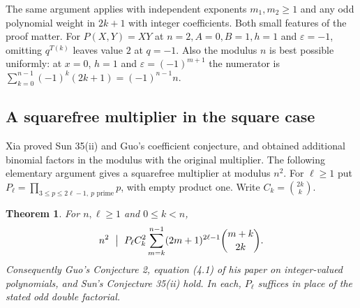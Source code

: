 \documentclass[11pt,a4paper]{article}
\newtheorem{theorem}{Theorem}[section]\newtheorem{lemma}[theorem]{Lemma}
\theoremstyle{definition}\newtheorem{problem}[theorem]{Auxiliary problem}
\theoremstyle{remark}\newtheorem*{remark}{Remark}
\begin{document}
The same argument applies with independent exponents $m_1,m_2\ge1$ and any odd polynomial weight in $2k+1$ with integer coefficients. Both small features of the proof matter. For $P(X,Y)=XY$ at $n=2,A=0,B=1,h=1$ and $\varepsilon=-1$, omitting $q^{T(k)}$ leaves value $2$ at $q=-1$. Also the modulus $n$ is best possible uniformly: at $x=0$, $h=1$ and $\varepsilon=(-1)^{m+1}$ the numerator is $\sum_{k=0}^{n-1}(-1)^k(2k+1)=(-1)^{n-1}n$.


\subsection{A squarefree multiplier in the square case}
Xia \cite{Xia} proved Sun 35(ii) and Guo's coefficient conjecture, and obtained additional binomial factors in the modulus with the original multiplier. The following elementary argument gives a squarefree multiplier at modulus $n^2$.
For $\ell\ge1$ put $P_\ell=\prod_{3\le p\le 2\ell-1,\ p\text{ prime}}p$,
with empty product one. Write $C_k=\binom{2k}{k}$.
\begin{theorem}
For $n,\ell\ge1$ and $0\le k<n$,
\[
 n^2\ \bigm|\ P_\ell C_k^2
 \sum_{m=k}^{n-1}(2m+1)^{2\ell-1}\binom{m+k}{2k}.
\]
Consequently Guo's Conjecture 2, equation (4.1) of his paper on integer-valued
polynomials, and Sun's Conjecture 35(ii) hold. In each, $P_\ell$ suffices in
place of the stated odd double factorial.
\end{theorem}
\end{document}
